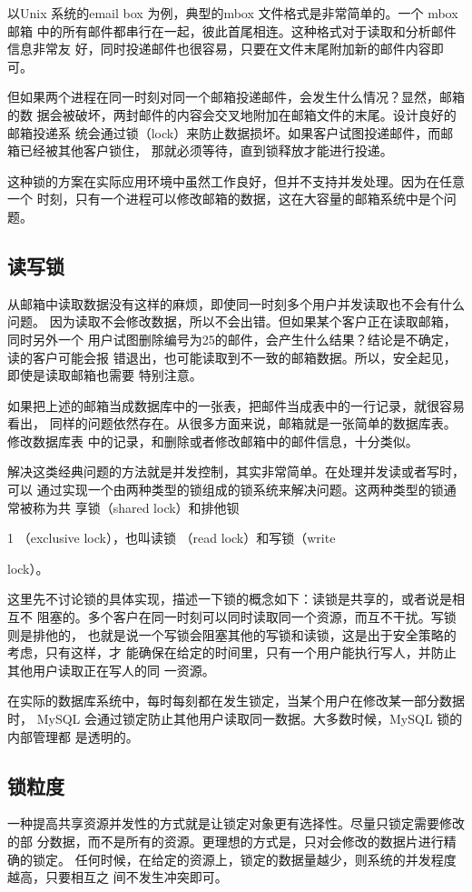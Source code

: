 以Unix 系统的email box 为例，典型的mbox 文件格式是非常简单的。一个 mbox 邮箱
中的所有邮件都串行在一起，彼此首尾相连。这种格式对于读取和分析邮件信息非常友
好，同时投递邮件也很容易，只要在文件末尾附加新的邮件内容即可。

但如果两个进程在同一时刻对同一个邮箱投递邮件，会发生什么情况？显然，邮箱的数
据会被破坏，两封邮件的内容会交叉地附加在邮箱文件的末尾。设计良好的邮箱投递系
统会通过锁（lock）来防止数据损坏。如果客户试图投递邮件，而邮箱已经被其他客户锁住，
那就必须等待，直到锁释放才能进行投递。

这种锁的方案在实际应用环境中虽然工作良好，但并不支持并发处理。因为在任意一个
时刻，只有一个进程可以修改邮箱的数据，这在大容量的邮箱系统中是个问题。

\subsection{读写锁}
从邮箱中读取数据没有这样的麻烦，即使同一时刻多个用户并发读取也不会有什么问题。
因为读取不会修改数据，所以不会出错。但如果某个客户正在读取邮箱，同时另外一个
用户试图删除编号为25的邮件，会产生什么结果？结论是不确定，读的客户可能会报
错退出，也可能读取到不一致的邮箱数据。所以，安全起见，即使是读取邮箱也需要
特别注意。

如果把上述的邮箱当成数据库中的一张表，把邮件当成表中的一行记录，就很容易看出，
同样的问题依然存在。从很多方面来说，邮箱就是一张简单的数据库表。修改数据库表
中的记录，和删除或者修改邮箱中的邮件信息，十分类似。

解决这类经典问题的方法就是并发控制，其实非常简单。在处理并发读或者写时，可以
通过实现一个由两种类型的锁组成的锁系统来解决问题。这两种类型的锁通常被称为共
享锁（shared lock）和排他钡

1 （exclusive lock），也叫读锁 （read lock）和写锁（write

lock）。

这里先不讨论锁的具体实现，描述一下锁的概念如下：读锁是共享的，或者说是相互不
阻塞的。多个客户在同一时刻可以同时读取同一个资源，而互不干扰。写锁则是排他的，
也就是说一个写锁会阻塞其他的写锁和读锁，这是出于安全策略的考虑，只有这样，才
能确保在给定的时间里，只有一个用户能执行写人，并防止其他用户读取正在写人的同
一资源。

在实际的数据库系统中，每时每刻都在发生锁定，当某个用户在修改某一部分数据时，
MySQL 会通过锁定防止其他用户读取同一数据。大多数时候，MySQL 锁的内部管理都
是透明的。

\subsection{锁粒度}
一种提高共享资源并发性的方式就是让锁定对象更有选择性。尽量只锁定需要修改的部
分数据，而不是所有的资源。更理想的方式是，只对会修改的数据片进行精确的锁定。
任何时候，在给定的资源上，锁定的数据量越少，则系统的并发程度越高，只要相互之
间不发生冲突即可。


